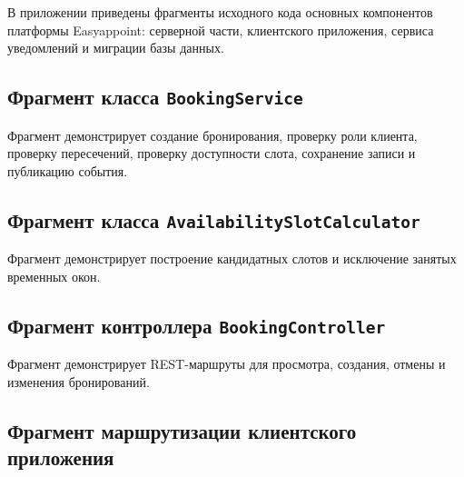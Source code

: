 
В приложении приведены фрагменты исходного кода основных компонентов платформы Easyappoint: серверной части, клиентского приложения, сервиса уведомлений и миграции базы данных.

\subsection*{Фрагмент класса \texttt{BookingService}}

Фрагмент демонстрирует создание бронирования, проверку роли клиента, проверку пересечений, проверку доступности слота, сохранение записи и публикацию события.



\subsection*{Фрагмент класса \texttt{AvailabilitySlotCalculator}}

Фрагмент демонстрирует построение кандидатных слотов и исключение занятых временных окон.



\subsection*{Фрагмент контроллера \texttt{BookingController}}

Фрагмент демонстрирует REST-маршруты для просмотра, создания, отмены и изменения бронирований.



\subsection*{Фрагмент маршрутизации клиентского приложения}


